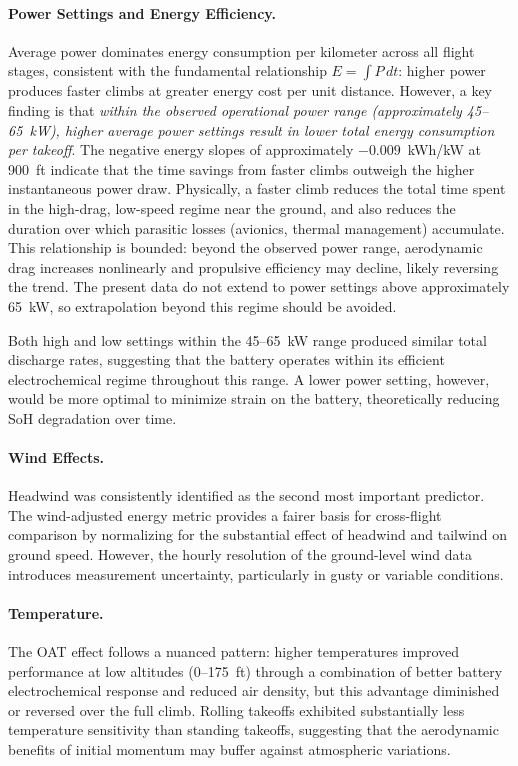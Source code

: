 \documentclass[11pt,a4paper]{article}
\begin{document}
\paragraph{Power Settings and Energy Efficiency.}
Average power dominates energy consumption per kilometer across all flight stages, consistent with the fundamental relationship $E = \int P\,dt$: higher power produces faster climbs at greater energy cost per unit distance.
However, a key finding is that \emph{within the observed operational power range (approximately 45--65~kW), higher average power settings result in lower total energy consumption per takeoff}.
The negative energy slopes of approximately $-0.009$~kWh/kW at 900~ft indicate that the time savings from faster climbs outweigh the higher instantaneous power draw.
Physically, a faster climb reduces the total time spent in the high-drag, low-speed regime near the ground, and also reduces the duration over which parasitic losses (avionics, thermal management) accumulate.
This relationship is bounded: beyond the observed power range, aerodynamic drag increases nonlinearly and propulsive efficiency may decline, likely reversing the trend.
The present data do not extend to power settings above approximately 65~kW, so extrapolation beyond this regime should be avoided.

Both high and low settings within the 45--65~kW range produced similar total discharge rates, suggesting that the battery operates within its efficient electrochemical regime throughout this range.
A lower power setting, however, would be more optimal to minimize strain on the battery, theoretically reducing SoH degradation over time.

\paragraph{Wind Effects.}
Headwind was consistently identified as the second most important predictor.
The wind-adjusted energy metric provides a fairer basis for cross-flight comparison by normalizing for the substantial effect of headwind and tailwind on ground speed.
However, the hourly resolution of the ground-level wind data introduces measurement uncertainty, particularly in gusty or variable conditions.

\paragraph{Temperature.}
The OAT effect follows a nuanced pattern: higher temperatures improved performance at low altitudes (0--175~ft) through a combination of better battery electrochemical response and reduced air density, but this advantage diminished or reversed over the full climb.
Rolling takeoffs exhibited substantially less temperature sensitivity than standing takeoffs, suggesting that the aerodynamic benefits of initial momentum may buffer against atmospheric variations.
\end{document}
